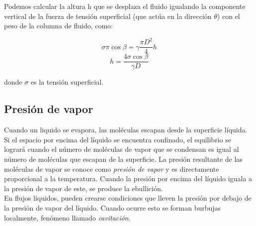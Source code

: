 Podemos calcular la altura h que se desplaza el fluido igualando la componente vertical de la fuerza de tensión superficial (que actúa en la dirección $\theta$) con el peso de la columna de fluido, como:

\begin{equation*}
	\sigma \pi \cos \beta = \gamma \dfrac{\pi D^2}{4} h
\end{equation*}
\begin{equation}
	h = \dfrac{4 \sigma \cos \beta}{\gamma D}
\end{equation}

donde $\sigma$ es la tensión superficial.

\subsection{Presión de vapor}
Cuando un liquido se evapora, las moléculas escapan desde la superficie líquida.  Si el espacio por encima del líquido se encuentra confinado, el equilibrio se logrará cuando el número de moléculas de vapor que se condensan es igual al número de moléculas que escapan de la superficie. La presión resultante de las moléculas de vapor se conoce como \emph{presión de vapor} y es directamente proporcional a la temperatura. Cuando la presión por encima del líquido iguala a la presión de vapor de este, se produce la ebullición. \\

En flujos líquidos, pueden crearse condiciones que lleven la presión por debajo de la presión de vapor del líquido. Cuando ocurre esto se forman burbujas localmente, fenómeno llamado \emph{cavitación}.



